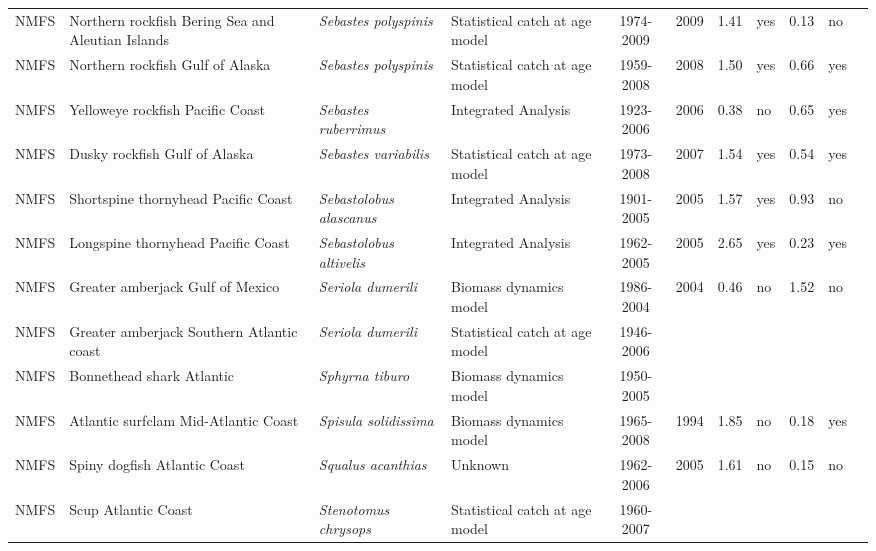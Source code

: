 \begin{longtable}{p{1.8cm}p{3.5cm}p{3.5cm}p{3cm}cccp{0.9cm}cp{0.9cm}c}
  NMFS & Northern rockfish Bering Sea and Aleutian Islands & \textit{Sebastes polyspinis} & Statistical catch at age model & 1974-2009 & 2009 & 1.41 & yes & 0.13 & no & \cite{2008_SAFE_BSAInorthern.pdf} \\ 
  NMFS & Northern rockfish Gulf of Alaska & \textit{Sebastes polyspinis} & Statistical catch at age model & 1959-2008 & 2008 & 1.50 & yes & 0.66 & yes & \cite{AFSC-NROCKGA-2008-Northern rockfish GA.pdf} \\ 
  NMFS & Yelloweye rockfish Pacific Coast & \textit{Sebastes ruberrimus} & Integrated Analysis & 1923-2006 & 2006 & 0.38 & no & 0.65 & yes & \cite{NWFSC-YEYEROCKPCOAST-2007-yelloweye.pdf} \\ 
  NMFS & Dusky rockfish Gulf of Alaska & \textit{Sebastes variabilis} & Statistical catch at age model & 1973-2008 & 2007 & 1.54 & yes & 0.54 & yes & \cite{AFSC-DUSROCKGA-2008-Dusky rockfish GA.pdf} \\ 
  NMFS & Shortspine thornyhead Pacific Coast & \textit{Sebastolobus alascanus} & Integrated Analysis & 1901-2005 & 2005 & 1.57 & yes & 0.93 & no & \cite{2005-SST-assessment.pdf} \\ 
  NMFS & Longspine thornyhead Pacific Coast & \textit{Sebastolobus altivelis} & Integrated Analysis & 1962-2005 & 2005 & 2.65 & yes & 0.23 & yes & \cite{2005-SAFE-Longspine.pdf} \\ 
  NMFS & Greater amberjack Gulf of Mexico & \textit{Seriola dumerili} & Biomass dynamics model & 1986-2004 & 2004 & 0.46 & no & 1.52 & no & \cite{JENSEN_GRAMBERGM_2006.pdf} \\ 
  NMFS & Greater amberjack Southern Atlantic coast & \textit{Seriola dumerili} & Statistical catch at age model & 1946-2006 &  &  &  &  &  & \cite{JENSEN_GRAMBERSATLC_2008.pdf} \\ 
  NMFS & Bonnethead shark Atlantic & \textit{Sphyrna tiburo} & Biomass dynamics model & 1950-2005 &  &  &  &  &  & \cite{SmallcoastalAtl2007-SEFSC.pdf} \\ 
  NMFS & Atlantic surfclam Mid-Atlantic Coast & \textit{Spisula solidissima} & Biomass dynamics model & 1965-2008 & 1994 & 1.85 & no & 0.18 & yes & \cite{Surfclam2007.pdf} \\ 
  NMFS & Spiny dogfish Atlantic Coast & \textit{Squalus acanthias} & Unknown & 1962-2006 & 2005 & 1.61 & no & 0.15 & no & \cite{spinydogfish2006.pdf} \\ 
  NMFS & Scup Atlantic Coast & \textit{Stenotomus chrysops} & Statistical catch at age model & 1960-2007 &  &  &  &  &  & \cite{crd0902.pdf} \\ 

\end{longtable}
